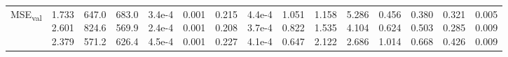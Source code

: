 \begin{landscape}
\begin{table}[t]
{\begin{tabular}{@{}lrrrrrrrrrrrrrr@{}}
MSE\textsubscript{val} & \makecell[r]{1.733\\2.601\\2.379} & \makecell[r]{647.0\\824.6\\571.2} & \makecell[r]{683.0\\569.9\\626.4} & \makecell[r]{3.4e-4\\2.4e-4\\4.5e-4} & \makecell[r]{0.001\\0.001\\0.001} & \makecell[r]{0.215\\0.208\\0.227} & \makecell[r]{4.4e-4\\3.7e-4\\4.1e-4} & \makecell[r]{1.051\\0.822\\0.647} & \makecell[r]{1.158\\1.535\\2.122} & \makecell[r]{5.286\\4.104\\2.686} & \makecell[r]{0.456\\0.624\\1.014} & \makecell[r]{0.380\\0.503\\0.668} & \makecell[r]{0.321\\0.285\\0.426} & \makecell[r]{0.005\\0.009\\0.009} \\

\end{tabular}}
\end{table}
\end{landscape}
